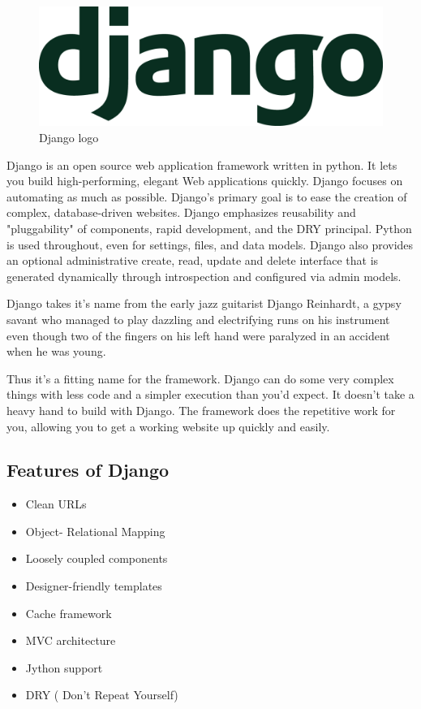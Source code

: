 \begin{figure}[h]
\centering \includegraphics[scale=0.13]{images/django.png}
\caption{Django logo}
\end{figure}
\noindent Django is an open source web application framework written in python. It lets 
you build high-performing, elegant Web applications quickly. Django 
focuses on automating as much as possible. Django's primary goal is to 
ease the creation of complex, database-driven websites. Django 
emphasizes reusability and "pluggability" of components, rapid 
development, and the DRY principal. Python is used throughout, even 
for settings, files, and data models. Django also provides an optional
 administrative create, read, update and delete interface that is 
generated dynamically through introspection and configured via admin 
models.

Django takes it's name from the early jazz guitarist Django Reinhardt, 
a gypsy savant who managed to play dazzling and electrifying runs on 
his instrument even though two of the fingers on his left hand were 
paralyzed in an accident when he was young.

Thus it’s a fitting name for the framework. Django can do some very 
complex things with less code and a simpler execution than you’d expect. 
It doesn't take a heavy hand to build with Django. The framework does 
the repetitive work for you, allowing you to get a working website up 
quickly and easily.
\subsection{Features of Django}
\begin{itemize}
\item Clean URLs
\item Object- Relational Mapping
\item Loosely coupled components
\item Designer-friendly templates  
\item Cache framework 
\item MVC architecture
\item Jython support
\item DRY ( Don't Repeat Yourself)
\end{itemize}
